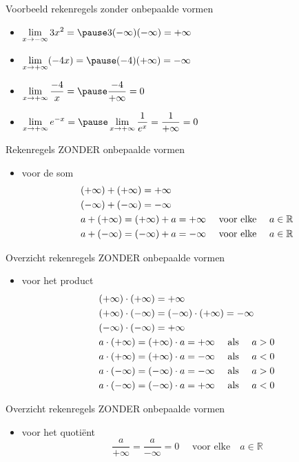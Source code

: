 \documentclass{beamer}
\newcommand{\ds}{\displaystyle}
\begin{document}
\begin{frame}{Voorbeeld rekenregels zonder onbepaalde vormen}
\begin{itemize}
\item $\ds \lim_{x \rightarrow - \infty} 3 x^2 = \pause 3(- \infty)(- \infty) = + \infty$
\item $\ds \lim_{x \rightarrow + \infty} (-4x)= \pause (-4)(+ \infty)= - \infty$
\item $\ds \lim_{x \rightarrow + \infty} \frac{-4}{x} = \pause \frac{-4}{+ \infty}=0$
\item $\ds \lim_{x \rightarrow + \infty} e^{-x} = \pause \lim_{x \rightarrow + \infty} \frac{1}{e^x} = \frac{1}{+ \infty} = 0$
\end{itemize}
\end{frame}

\begin{frame}{Rekenregels ZONDER onbepaalde vormen}
\begin{itemize}
\item voor de som
\[\aligned
& (+ \infty) + (+ \infty) = + \infty \\
& (- \infty) + (-\infty) = - \infty \\
& a + (+ \infty) = (+ \infty) + a = + \infty \quad \text { voor elke
} \quad a
\in \mathbb{R} \\
& a + (- \infty) = (-\infty) + a = - \infty \quad \text { voor elke } \quad a
\in \mathbb{R} \\
\endaligned
\]
\end{itemize}
\end{frame}
\begin{frame}{Overzicht rekenregels ZONDER onbepaalde vormen}
\begin{itemize}
\item voor het product
\[\aligned
& (+ \infty) \cdot (+ \infty) = + \infty\\
& (+ \infty) \cdot (-\infty) = (-\infty) \cdot (+ \infty) = - \infty \\
& (-\infty) \cdot (-\infty) = + \infty   \\
& a \cdot (+ \infty) = (+ \infty) \cdot a = + \infty \quad \text {
als } \quad a
> 0 \\
& a \cdot (+ \infty) = (+ \infty) \cdot a = - \infty \quad \text { als } \quad a
< 0 \\
& a \cdot (- \infty) = (- \infty) \cdot a = - \infty \quad \text { als } \quad a
> 0 \\
& a \cdot (- \infty) = (- \infty) \cdot a = + \infty \quad \text { als } \quad a
< 0 \\
\endaligned
\]

\end{itemize}
\end{frame}
\begin{frame}{Overzicht rekenregels ZONDER onbepaalde vormen}
\begin{itemize}
	\item voor het quoti\"ent
	$$\frac{a}{+ \infty} = \frac{a}{-\infty} = 0 \quad \text { voor elke
} \quad a \in \mathbb{R}$$
\end{itemize}
\end{frame}
\end{document}
